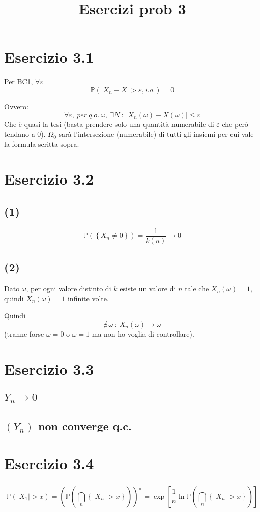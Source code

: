 \documentclass{article}
\title{Esercizi prob 3}
\begin{document}
\maketitle
\section{Esercizio 3.1}
Per BC1, $\forall  \varepsilon $ 
\[
	\mathbb{P}\left(|X_n - X| >\varepsilon , i.o.\right) = 0
\]

Ovvero: 
\[
	\forall \varepsilon , \ per\ q.o.\ \omega ,\  \exists N\ :\ |X_n(\omega ) - X(\omega )| \leq \varepsilon 
\]
Che è quasi la tesi (basta prendere solo una quantità numerabile di $\varepsilon $ che però tendano a $0$). $\Omega _0$ sarà l'intersezione (numerabile) di tutti gli insiemi per cui vale la formula scritta sopra.

\section{Esercizio 3.2}
\subsection{(1)}
\[
	\mathbb{P}\left(\left\{X_n \neq  0\right\}\right) = \frac{1}{k(n)} \rightarrow 0
\]

\subsection{(2)}
Dato $\omega $, per ogni valore distinto di $k$ esiste un valore di $n$ tale che $X_n(\omega ) =1$, quindi $X_n\left(\omega \right) = 1$ infinite volte.

Quindi
\[
	\nexists\, \omega \ : \ X_n(\omega ) \rightarrow  \omega 
\]
(tranne forse $\omega =0$ o $\omega =1$ ma non ho voglia di controllare).


\section{Esercizio 3.3}
\subsection{$Y_n \rightarrow  0$}

\subsection{$\left(Y_n\right)$ non converge q.c.}


\section{Esercizio 3.4}
\[
	\mathbb{P}\left(|X_1|>x\right) = \left(\mathbb{P}\left(\bigcap_{n} \left\{|X_n| > x\right\}\right)\right)^{\frac{1}{n}} = \exp \left[\frac{1}{n} \ln \mathbb{P}\left(\bigcap_n \left\{|X_n| > x\right\}\right)\right]
\]
\end{document}
